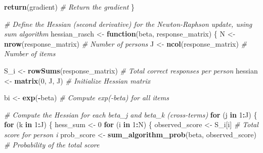 \documentclass[
]{article}
\newenvironment{Shaded}{\begin{snugshade}}{\end{snugshade}}
\newcommand{\CommentTok}[1]{\textcolor[rgb]{0.56,0.35,0.01}{\textit{#1}}}
\newcommand{\ControlFlowTok}[1]{\textcolor[rgb]{0.13,0.29,0.53}{\textbf{#1}}}
\newcommand{\DecValTok}[1]{\textcolor[rgb]{0.00,0.00,0.81}{#1}}
\newcommand{\FunctionTok}[1]{\textcolor[rgb]{0.13,0.29,0.53}{\textbf{#1}}}
\newcommand{\NormalTok}[1]{#1}
\newcommand{\OtherTok}[1]{\textcolor[rgb]{0.56,0.35,0.01}{#1}}
\newcommand{\SpecialCharTok}[1]{\textcolor[rgb]{0.81,0.36,0.00}{\textbf{#1}}}
\begin{document}
\begin{Shaded}
\begin{Highlighting}[]
  \FunctionTok{return}\NormalTok{(gradient)  }\CommentTok{\# Return the gradient}
\NormalTok{\}}
\end{Highlighting}
\end{Shaded}

\begin{Shaded}
\begin{Highlighting}[]
\CommentTok{\# Define the Hessian (second derivative) for the Newton{-}Raphson update, using sum algorithm}
\NormalTok{hessian\_rasch }\OtherTok{\textless{}{-}} \ControlFlowTok{function}\NormalTok{(beta, response\_matrix) \{}
\NormalTok{  N }\OtherTok{\textless{}{-}} \FunctionTok{nrow}\NormalTok{(response\_matrix) }\CommentTok{\# Number of persons}
\NormalTok{  J }\OtherTok{\textless{}{-}} \FunctionTok{ncol}\NormalTok{(response\_matrix) }\CommentTok{\# Number of items}

\NormalTok{  S\_i }\OtherTok{\textless{}{-}} \FunctionTok{rowSums}\NormalTok{(response\_matrix) }\CommentTok{\# Total correct responses per person}
\NormalTok{  hessian }\OtherTok{\textless{}{-}} \FunctionTok{matrix}\NormalTok{(}\DecValTok{0}\NormalTok{, J, J)  }\CommentTok{\# Initialize Hessian matrix}
  
\NormalTok{  bi }\OtherTok{\textless{}{-}} \FunctionTok{exp}\NormalTok{(}\SpecialCharTok{{-}}\NormalTok{beta) }\CommentTok{\# Compute exp({-}beta) for all items}
  
  \CommentTok{\# Compute the Hessian for each beta\_j and beta\_k (cross{-}terms)}
  \ControlFlowTok{for}\NormalTok{ (j }\ControlFlowTok{in} \DecValTok{1}\SpecialCharTok{:}\NormalTok{J) \{}
    \ControlFlowTok{for}\NormalTok{ (k }\ControlFlowTok{in} \DecValTok{1}\SpecialCharTok{:}\NormalTok{J) \{}
\NormalTok{      hess\_sum }\OtherTok{\textless{}{-}} \DecValTok{0}
      \ControlFlowTok{for}\NormalTok{ (i }\ControlFlowTok{in} \DecValTok{1}\SpecialCharTok{:}\NormalTok{N) \{}
\NormalTok{        observed\_score }\OtherTok{\textless{}{-}}\NormalTok{ S\_i[i]  }\CommentTok{\# Total score for person i}
\NormalTok{        prob\_score }\OtherTok{\textless{}{-}} \FunctionTok{sum\_algorithm\_prob}\NormalTok{(beta, observed\_score)  }\CommentTok{\# Probability of the total score}
        


\end{Highlighting}
\end{Shaded}
\end{document}
